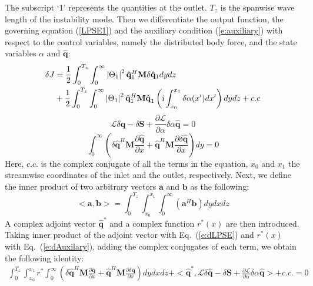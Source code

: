 The subscript `1' represents the quantities at the outlet. $T_z$ is the spanwise wave length of the instability mode. Then we differentiate the output function, the governing equation (\ref{LPSE1}) and the auxiliary condition (\ref{e:auxiliary}) with respect to the control variables, namely the distributed body force, and the state variables $\alpha$ and $\mathbf{\hat q}$:
\begin{equation}
\begin{aligned}
\delta J & = \frac{1}
{2}\int_0^{T_z } {\int_0^\infty  {\left| {\Theta _1 } \right|^2 {\mathbf{\hat q}}_1 ^H {\mathbf{M}}\delta {\mathbf{\hat q}}_1 dydz} }  \\
         &+ \frac{1}{2}\int_0^{T_z } {\int_0^\infty  {\left| {\Theta _1 } \right|^2 {\mathbf{\hat q}}_1 ^H {\mathbf{M\hat q}}_1 \left( {{\rm i}\int_{x_0 }^{x_1 } {\delta \alpha (x')dx'} } \right)dydz} }  + c.c \\
\end{aligned}
\end{equation}
\begin{equation}
\label{e:dLPSE}
\mathscr{L}\delta {\mathbf{\hat q}} - \delta {\mathbf{S}} + \frac{{\partial {\mathscr{L}}}}
{{\partial \alpha }}\delta \alpha {\mathbf{\hat q}} = 0
\end{equation}
\begin{equation}
\label{e:dAuxilary}
\int_0^\infty  {\left( {\delta {\mathbf{\hat q}}^H {\mathbf{M}}\frac{{\partial {\mathbf{\hat q}}}}
{{\partial x}} + {\mathbf{\hat q}}^H {\mathbf{M}}\frac{{\partial \delta {\mathbf{\hat q}}}}
{{\partial x}}} \right)dy}  = 0
\end{equation}
Here, $c.c.$ is the complex conjugate of all the terms in the equation, $x_0$ and $x_1$  the streamwise coordinates of the inlet and the outlet, respectively. Next, we define the inner product of two arbitrary vectors $\mathbf a$ and $\mathbf b$ as the following:
\begin{equation}
\label{e:innerproduct}
<\mathbf{a},\mathbf{b}>=\int_{0}^{T_z}\int_{x_0}^{x_1}\int_{0}^\infty (\mathbf{a}^H\mathbf{b})dydxdz
\end{equation}
A complex adjoint vector ${\mathbf{\hat q}}^*$ and a complex function $r^*(x)$ are then introduced. Taking inner product of the adjoint vector with Eq.~(\ref{e:dLPSE}) and $r^*(x)$ with Eq.~(\ref{e:dAuxilary}), adding the complex conjugates of each term, we obtain the following identity:
\begin{equation}
\label{e:dadjoint1}
\begin{aligned}
     \int_{0}^{T_z} {\int_{x_0}^{x_1}{r^* \int_0^\infty  {\left( {\delta {\mathbf{\hat q}}^H {\mathbf{M}}\frac{{\partial {\mathbf{\hat q}}}}{{\partial x}} + {\mathbf{\hat q}}^H {\mathbf{M}}\frac{{\partial \delta {\mathbf{\hat q}}}}{{\partial x}}} \right)dydxdz} } }%
     +<{\mathbf{\hat q}}^*,{\mathscr{L}}\delta {\mathbf{\hat q}}-\delta {\mathbf{S}} + \frac{{\partial {\mathscr{L}}}}{{\partial \alpha }}\delta \alpha {\mathbf{\hat q}} > + c.c. = 0
\end{aligned}
\end{equation}
